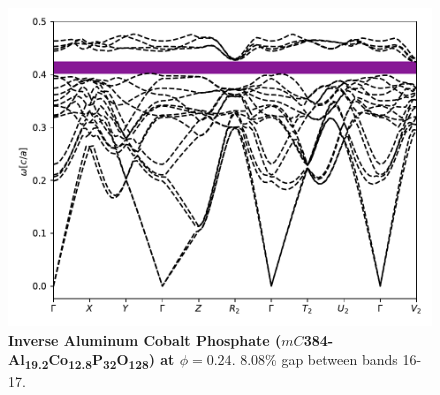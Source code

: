 \documentclass[fleqn,amsmath,amssymb,superscriptaddress, reprint,prl]{revtex4-1}
\begin{document}
\begin{figure}
\includegraphics[width=0.9\linewidth]{workspace/233d10341806b62f6e4d74cb17687c23/images/r=22.pdf}
	\caption{\textbf{Inverse Aluminum Cobalt Phosphate ($mC$384-Al\textsubscript{1}\textsubscript{9}\textsubscript{.}\textsubscript{2}Co\textsubscript{1}\textsubscript{2}\textsubscript{.}\textsubscript{8}P\textsubscript{3}\textsubscript{2}O\textsubscript{1}\textsubscript{2}\textsubscript{8}) at $\phi=0.24$}. 8.08\% gap between bands 16-17.}
\end{figure}
\end{document}
